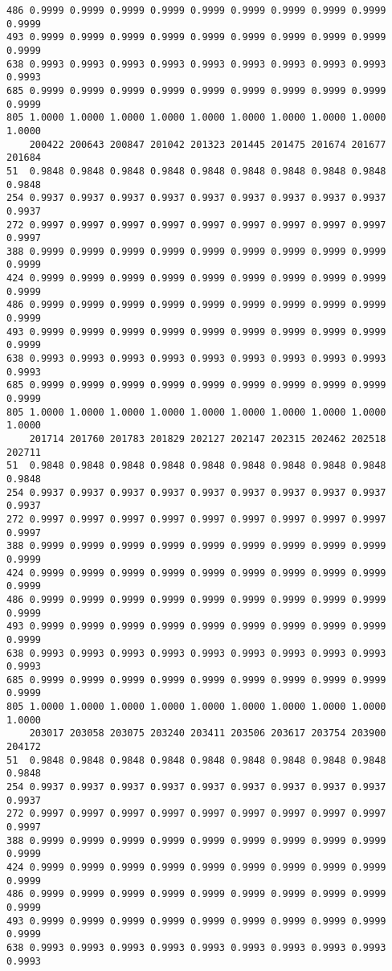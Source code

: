 \documentclass[
]{report}
\begin{document}
\begin{verbatim}
486 0.9999 0.9999 0.9999 0.9999 0.9999 0.9999 0.9999 0.9999 0.9999 0.9999
493 0.9999 0.9999 0.9999 0.9999 0.9999 0.9999 0.9999 0.9999 0.9999 0.9999
638 0.9993 0.9993 0.9993 0.9993 0.9993 0.9993 0.9993 0.9993 0.9993 0.9993
685 0.9999 0.9999 0.9999 0.9999 0.9999 0.9999 0.9999 0.9999 0.9999 0.9999
805 1.0000 1.0000 1.0000 1.0000 1.0000 1.0000 1.0000 1.0000 1.0000 1.0000
    200422 200643 200847 201042 201323 201445 201475 201674 201677 201684
51  0.9848 0.9848 0.9848 0.9848 0.9848 0.9848 0.9848 0.9848 0.9848 0.9848
254 0.9937 0.9937 0.9937 0.9937 0.9937 0.9937 0.9937 0.9937 0.9937 0.9937
272 0.9997 0.9997 0.9997 0.9997 0.9997 0.9997 0.9997 0.9997 0.9997 0.9997
388 0.9999 0.9999 0.9999 0.9999 0.9999 0.9999 0.9999 0.9999 0.9999 0.9999
424 0.9999 0.9999 0.9999 0.9999 0.9999 0.9999 0.9999 0.9999 0.9999 0.9999
486 0.9999 0.9999 0.9999 0.9999 0.9999 0.9999 0.9999 0.9999 0.9999 0.9999
493 0.9999 0.9999 0.9999 0.9999 0.9999 0.9999 0.9999 0.9999 0.9999 0.9999
638 0.9993 0.9993 0.9993 0.9993 0.9993 0.9993 0.9993 0.9993 0.9993 0.9993
685 0.9999 0.9999 0.9999 0.9999 0.9999 0.9999 0.9999 0.9999 0.9999 0.9999
805 1.0000 1.0000 1.0000 1.0000 1.0000 1.0000 1.0000 1.0000 1.0000 1.0000
    201714 201760 201783 201829 202127 202147 202315 202462 202518 202711
51  0.9848 0.9848 0.9848 0.9848 0.9848 0.9848 0.9848 0.9848 0.9848 0.9848
254 0.9937 0.9937 0.9937 0.9937 0.9937 0.9937 0.9937 0.9937 0.9937 0.9937
272 0.9997 0.9997 0.9997 0.9997 0.9997 0.9997 0.9997 0.9997 0.9997 0.9997
388 0.9999 0.9999 0.9999 0.9999 0.9999 0.9999 0.9999 0.9999 0.9999 0.9999
424 0.9999 0.9999 0.9999 0.9999 0.9999 0.9999 0.9999 0.9999 0.9999 0.9999
486 0.9999 0.9999 0.9999 0.9999 0.9999 0.9999 0.9999 0.9999 0.9999 0.9999
493 0.9999 0.9999 0.9999 0.9999 0.9999 0.9999 0.9999 0.9999 0.9999 0.9999
638 0.9993 0.9993 0.9993 0.9993 0.9993 0.9993 0.9993 0.9993 0.9993 0.9993
685 0.9999 0.9999 0.9999 0.9999 0.9999 0.9999 0.9999 0.9999 0.9999 0.9999
805 1.0000 1.0000 1.0000 1.0000 1.0000 1.0000 1.0000 1.0000 1.0000 1.0000
    203017 203058 203075 203240 203411 203506 203617 203754 203900 204172
51  0.9848 0.9848 0.9848 0.9848 0.9848 0.9848 0.9848 0.9848 0.9848 0.9848
254 0.9937 0.9937 0.9937 0.9937 0.9937 0.9937 0.9937 0.9937 0.9937 0.9937
272 0.9997 0.9997 0.9997 0.9997 0.9997 0.9997 0.9997 0.9997 0.9997 0.9997
388 0.9999 0.9999 0.9999 0.9999 0.9999 0.9999 0.9999 0.9999 0.9999 0.9999
424 0.9999 0.9999 0.9999 0.9999 0.9999 0.9999 0.9999 0.9999 0.9999 0.9999
486 0.9999 0.9999 0.9999 0.9999 0.9999 0.9999 0.9999 0.9999 0.9999 0.9999
493 0.9999 0.9999 0.9999 0.9999 0.9999 0.9999 0.9999 0.9999 0.9999 0.9999
638 0.9993 0.9993 0.9993 0.9993 0.9993 0.9993 0.9993 0.9993 0.9993 0.9993

\end{verbatim}
\end{document}
